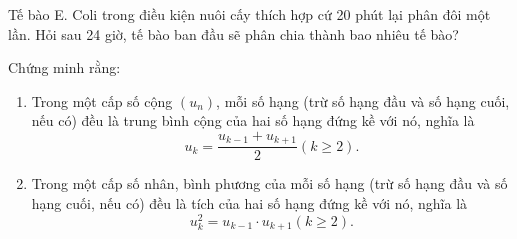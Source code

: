 \begin{bt}%
    Tế bào E. Coli trong điều kiện nuôi cấy thích hợp cứ 20 phút lại phân đôi một lần. Hỏi sau 24 giờ, tế bào ban đầu sẽ phân chia thành bao nhiêu tế bào?
\end{bt}

\begin{bt}%
    Chứng minh rằng:
    \begin{enumerate}
    \item Trong một cấp số cộng $\left( u_n \right)$, mỗi số hạng (trừ số hạng đầu và số hạng cuối, nếu có) đều là trung bình cộng của hai số hạng đứng kề với nó, nghĩa là
    $$u_k=\dfrac{u_{k-1}+u_{k+1}}{2} \left( k\ge 2 \right).$$
    \item Trong một cấp số nhân, bình phương của mỗi số hạng (trừ số hạng đầu và số hạng cuối, nếu có) đều là tích của hai số hạng đứng kề với nó, nghĩa là
    $$u_k^2=u_{k-1}\cdot u_{k+1} \left( k\ge 2 \right).$$
    \end{enumerate}
\end{bt}

